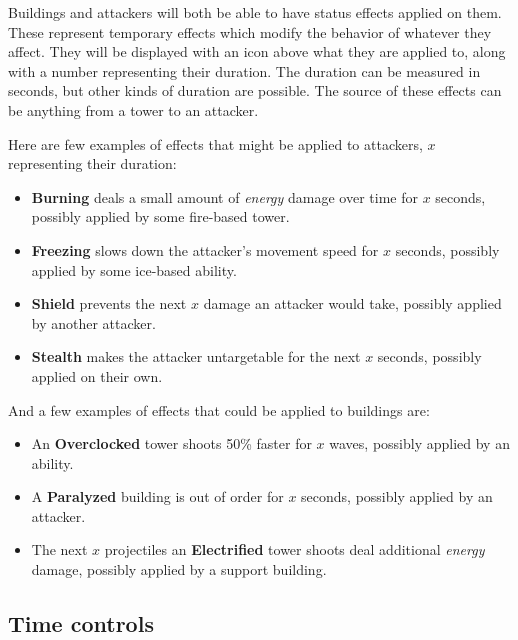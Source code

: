 \begin{notindemo}
    Buildings and attackers will both be able to have status effects applied on them.
    These represent temporary effects which modify the behavior of whatever they affect.
    They will be displayed with an icon above what they are applied to, along with a number representing their duration.
    The duration can be measured in seconds, but other kinds of duration are possible.
    The source of these effects can be anything from a tower to an attacker.

    Here are few examples of effects that might be applied to attackers, $x$ representing their duration:
    \begin{itemize}
        \item \textbf{Burning} deals a small amount of \emph{energy} damage over time for $x$ seconds, possibly applied by some fire-based tower.
        \item \textbf{Freezing} slows down the attacker's movement speed for $x$ seconds, possibly applied by some ice-based ability.
        \item \textbf{Shield} prevents the next $x$ damage an attacker would take, possibly applied by another attacker.
        \item \textbf{Stealth} makes the attacker untargetable for the next $x$ seconds, possibly applied on their own.
    \end{itemize}

    And a few examples of effects that could be applied to buildings are:
    \begin{itemize}
        \item An \textbf{Overclocked} tower shoots 50\% faster for $x$ waves, possibly applied by an ability.
        \item A \textbf{Paralyzed} building is out of order for $x$ seconds, possibly applied by an attacker.
        \item The next $x$ projectiles an \textbf{Electrified} tower shoots deal additional \emph{energy} damage, possibly applied by a support building.
    \end{itemize}
\end{notindemo}

\subsection{Time controls}\label{sec:design-time-controls}

